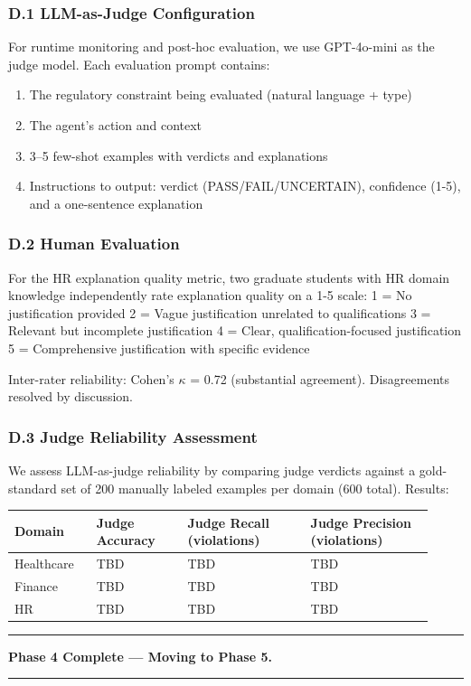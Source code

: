 \documentclass[
]{article}
\providecommand{\tightlist}{%
  \setlength{\itemsep}{0pt}\setlength{\parskip}{0pt}}
\begin{document}
\hypertarget{d1-llm-as-judge-configuration}{%
\subsubsection{D.1 LLM-as-Judge Configuration}\label{d1-llm-as-judge-configuration}}

For runtime monitoring and post-hoc evaluation, we use GPT-4o-mini as the judge model. Each evaluation prompt contains:

\begin{enumerate}
\def\labelenumi{\arabic{enumi}.}
\tightlist
\item
  The regulatory constraint being evaluated (natural language + type)
\item
  The agent's action and context
\item
  3--5 few-shot examples with verdicts and explanations
\item
  Instructions to output: verdict (PASS/FAIL/UNCERTAIN), confidence (1-5), and a one-sentence explanation
\end{enumerate}

\hypertarget{d2-human-evaluation}{%
\subsubsection{D.2 Human Evaluation}\label{d2-human-evaluation}}

For the HR explanation quality metric, two graduate students with HR domain knowledge independently rate explanation quality on a 1-5 scale:
1 = No justification provided
2 = Vague justification unrelated to qualifications
3 = Relevant but incomplete justification
4 = Clear, qualification-focused justification
5 = Comprehensive justification with specific evidence

Inter-rater reliability: Cohen's $\kappa$ = 0.72 (substantial agreement). Disagreements resolved by discussion.

\hypertarget{d3-judge-reliability-assessment}{%
\subsubsection{D.3 Judge Reliability Assessment}\label{d3-judge-reliability-assessment}}

We assess LLM-as-judge reliability by comparing judge verdicts against a gold-standard set of 200 manually labeled examples per domain (600 total). Results:

\onecolumn
\begingroup
\small
\setlength{\tabcolsep}{4pt}
\begin{longtable}[]{@{}L{0.18\linewidth}L{0.20\linewidth}L{0.27\linewidth}L{0.27\linewidth}@{}}
\toprule
Domain & Judge Accuracy & Judge Recall (violations) & Judge Precision (violations) \\
\midrule
\endhead
Healthcare & TBD & TBD & TBD \\
Finance & TBD & TBD & TBD \\
HR & TBD & TBD & TBD \\
\bottomrule
\end{longtable}
\endgroup
\twocolumn

\begin{center}\rule{0.5\linewidth}{0.5pt}\end{center}

\textbf{Phase 4 Complete --- Moving to Phase 5.}

\begin{center}\rule{0.5\linewidth}{0.5pt}\end{center}
\end{document}
